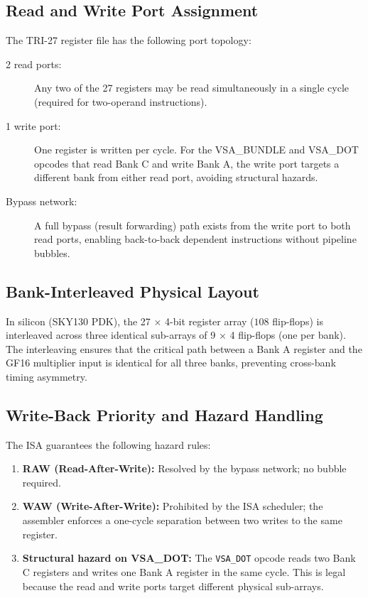 \subsection{Read and Write Port Assignment}
\label{subsec:71:ports}

The TRI-27 register file has the following port topology:
\begin{description}
  \item[2 read ports:] Any two of the 27 registers may be read
    simultaneously in a single cycle (required for two-operand
    instructions).
  \item[1 write port:] One register is written per cycle.  For the
    VSA\_BUNDLE and VSA\_DOT opcodes that read Bank C and write Bank A,
    the write port targets a different bank from either read port,
    avoiding structural hazards.
  \item[Bypass network:] A full bypass (result forwarding) path exists
    from the write port to both read ports, enabling
    back-to-back dependent instructions without pipeline bubbles.
\end{description}

\subsection{Bank-Interleaved Physical Layout}
\label{subsec:71:physical-layout}

In silicon (SKY130 PDK), the 27 × 4-bit register array ($108$ flip-flops)
is interleaved across three identical sub-arrays of 9 × 4 flip-flops
(one per bank).  The interleaving ensures that the critical path between
a Bank A register and the GF16 multiplier input is identical for all
three banks, preventing cross-bank timing asymmetry.

\subsection{Write-Back Priority and Hazard Handling}
\label{subsec:71:hazard}

The ISA guarantees the following hazard rules:
\begin{enumerate}
  \item \textbf{RAW (Read-After-Write):} Resolved by the bypass
    network; no bubble required.
  \item \textbf{WAW (Write-After-Write):} Prohibited by the ISA
    scheduler; the assembler enforces a one-cycle separation between
    two writes to the same register.
  \item \textbf{Structural hazard on VSA\_DOT:} The \texttt{VSA\_DOT}
    opcode reads two Bank C registers and writes one Bank A register
    in the same cycle.  This is legal because the read and write
    ports target different physical sub-arrays.
\end{enumerate}

